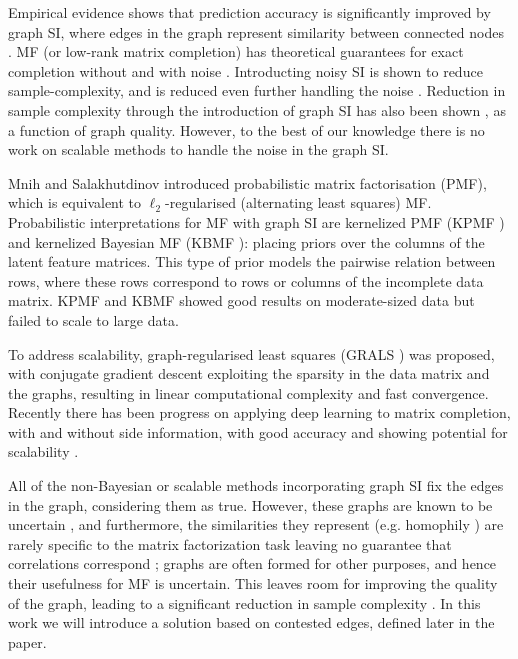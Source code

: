 \documentclass{article}
\theoremstyle{plain}
\theoremstyle{definition}
\theoremstyle{remark}
\begin{document}
Empirical evidence shows that prediction accuracy is significantly improved by graph SI, where edges in the graph represent similarity between connected nodes \cite{cai2011graph,ma2011recommender,monti2017geometric,rao2015collaborative,yao2018convolutional,zhou2012kernelized,zhao2015expert}. MF (or low-rank matrix completion) has theoretical guarantees for exact completion without and with noise \cite{candes2010matrix,candes2009exact}. 
Introducting noisy SI is shown to reduce sample-complexity, and is reduced even further handling the noise \cite{chiang2015matrix}. Reduction in sample complexity through the introduction of graph SI has also been shown \cite{ahn2018binary,rao2015collaborative}, as a function of graph quality.  However, to the best of our knowledge there is no work on scalable methods to handle the noise in the graph SI.

Mnih and Salakhutdinov  \cite{mnih2008probabilistic} introduced probabilistic matrix factorisation (PMF), which is equivalent to $\ell_2$-regularised (alternating least squares) MF. Probabilistic interpretations for MF with graph SI are kernelized PMF (KPMF  \cite{zhou2012kernelized}) and kernelized Bayesian MF (KBMF \cite{gonen2013kernelized}): placing priors over the columns of the latent feature matrices. This type of prior models the pairwise relation between rows, where these rows correspond to rows or columns of the incomplete data matrix. KPMF and KBMF showed good results on moderate-sized data but failed to scale to large data. 

To address scalability, graph-regularised least squares (GRALS \cite{rao2015collaborative}) was  proposed, with conjugate gradient descent exploiting the sparsity in the data matrix and the graphs, resulting in linear computational complexity and fast convergence. Recently there has been progress on applying deep learning to matrix completion, with and without side information, with good accuracy and showing potential for scalability \cite{berg2017graph,hartford2018deep,monti2017geometric,yao2018convolutional}.

All of the non-Bayesian or scalable methods incorporating graph SI \cite{cai2011graph,ma2011recommender,monti2017geometric,rao2015collaborative,zhou2012kernelized} fix the edges in the graph, considering them as true.  However, these graphs are known to be uncertain \cite{adar2007managing,asthana2004predicting}, and furthermore, the similarities they represent (e.g. homophily \cite{mcpherson2001birds}) are rarely specific to the matrix factorization task leaving no guarantee that correlations correspond \cite{ma2011recommender,singla2008yes}; graphs are often formed for other purposes, and hence their usefulness for MF is uncertain. This leaves room for improving the quality of the graph, leading to a significant reduction in sample complexity \cite{ahn2018binary}. In this work we will introduce a solution based on contested edges, defined later in the paper.
\end{document}
